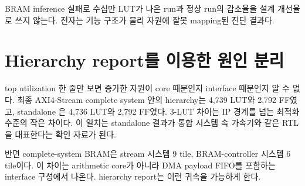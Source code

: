 \begin{warningbox}[흔한 오판]
BRAM inference 실패로 수십만 LUT가 나온 run과 정상 run의 감소율을 설계 개선율로
쓰지 않는다. 전자는 기능 구조가 물리 자원에 잘못 mapping된 진단 결과다.
\end{warningbox}

\section{Hierarchy report를 이용한 원인 분리}

top utilization 한 줄만 보면 증가한 자원이 core 때문인지 interface 때문인지
알 수 없다. 최종 AXI4-Stream complete system 안의  hierarchy는
4,739 LUT와 2,792 FF였고, standalone 은 4,736 LUT와 2,792 FF였다.
3-LUT 차이는 IP 경계를 넘는 최적화 수준의 작은 차이다. 이 일치는 standalone
결과가 통합 시스템 속 가속기와 같은 RTL을 대표한다는 확인 자료가 된다.

반면 complete-system BRAM은 stream 시스템 9 tile, BRAM-controller 시스템
6 tile이다. 이 차이는 arithmetic core가 아니라 DMA payload FIFO를 포함하는
interface 구성에서 나온다. hierarchy report는 이런 귀속을 가능하게 한다.
